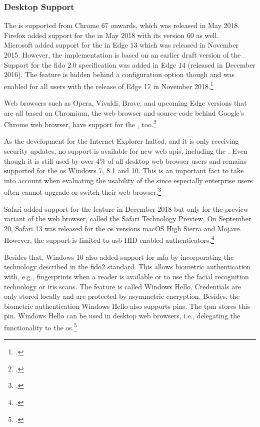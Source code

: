 \subsubsection{Desktop Support}

The \wa{} is supported from Chrome 67 onwards, which was released in May 2018. Firefox added support for the \wa{} in May 2018 with its version 60 as well.\\
Microsoft added support for the \wa{} in Edge 13 which was released in November 2015. However, the implementation is based on an earlier draft version of the \wa. Support for the \gls{fido} 2.0 specification was added in Edge 14 (released in December 2016). The feature is hidden behind a configuration option though and was enabled for all users with the release of Edge 17 in November 2018.\footcite[See][112]{Jacobs:2019}

Web browsers such as Opera, Vivaldi, Brave, and upcoming Edge versions that are all based on Chromium, the web browser and source code behind Google's Chrome web browser, have support for the \wa, too.\footcites[See][Chapter 7.1]{kissell2019take}

As the development for the Internet Explorer halted, and it is only receiving security updates, no support is available for new web \glspl{api}, including the \wa. Even though it is still used by over 4\% of all desktop web browser users and remains supported for the \gls{os} Windows 7, 8.1 and 10. This is an important fact to take into account when evaluating the usability of the \wa{} since especially enterprise users often cannot upgrade or switch their web browser.\footcites[See][]{ie-support}[See][]{statcounter-desktop}

Safari added support for the \wa{} feature in December 2018 but only for the preview variant of the web browser, called the Safari Technology Preview. On September 20, Safari 13 was released for the \gls{os} versions macOS High Sierra and Mojave. However, the support is limited to \gls{usb}-HID enabled authenticators.\footcites[See][]{safari-webauthn}[See][]{safari-13-release}

Besides that, Windows 10 also added support for \gls{mfa} by incorporating the technology described in the \gls{fido}2 standard. This allows biometric authentication with, e.g., fingerprints when a reader is available or to use the facial recognition technology or iris scans. The feature is called \frqq Windows Hello\flqq{}. Credentials are only stored locally and are protected by asymmetric encryption. Besides, the biometric authentication Windows Hello also supports \glspl{pin}. The \gls{tpm} stores this \gls{pin}. Windows Hello can be used in desktop web browsers, i.e., delegating the \wa{} functionality to the \gls{os}.\footcites[See][]{201612}[See][6]{fido-whitepaper-amd}

